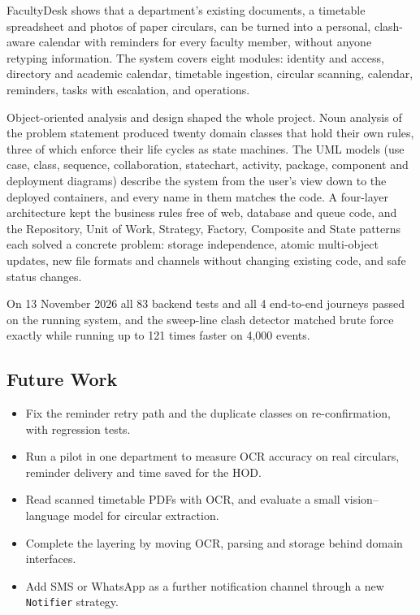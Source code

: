 
FacultyDesk shows that a department's existing documents, a timetable spreadsheet and photos of paper circulars, can be turned into a personal, clash-aware calendar with reminders for every faculty member, without anyone retyping information. The system covers eight modules: identity and access, directory and academic calendar, timetable ingestion, circular scanning, calendar, reminders, tasks with escalation, and operations.

Object-oriented analysis and design shaped the whole project. Noun analysis of the problem statement produced twenty domain classes that hold their own rules, three of which enforce their life cycles as state machines. The UML models (use case, class, sequence, collaboration, statechart, activity, package, component and deployment diagrams) describe the system from the user's view down to the deployed containers, and every name in them matches the code. A four-layer architecture kept the business rules free of web, database and queue code, and the Repository, Unit of Work, Strategy, Factory, Composite and State patterns each solved a concrete problem: storage independence, atomic multi-object updates, new file formats and channels without changing existing code, and safe status changes.

On 13 November 2026 all 83 backend tests and all 4 end-to-end journeys passed on the running system, and the sweep-line clash detector matched brute force exactly while running up to 121 times faster on 4,000 events.

\subsection{Future Work}
\begin{itemize}
  \item Fix the reminder retry path and the duplicate classes on re-confirmation, with regression tests.
  \item Run a pilot in one department to measure OCR accuracy on real circulars, reminder delivery and time saved for the HOD.
  \item Read scanned timetable PDFs with OCR, and evaluate a small vision--language model for circular extraction.
  \item Complete the layering by moving OCR, parsing and storage behind domain interfaces.
  \item Add SMS or WhatsApp as a further notification channel through a new \texttt{Notifier} strategy.
\end{itemize}
